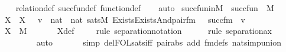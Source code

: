 \begin{isabellebody}
\ \ \isamarkupfalse%
\ relation{\isacharunderscore}{\kern0pt}def\ succ{\isacharunderscore}{\kern0pt}fun{\isacharunderscore}{\kern0pt}def\ function{\isacharunderscore}{\kern0pt}def\isanewline
\ \ \isamarkupfalse%
\ auto%
\endisatagproof
{\isafoldproof}%
%
\isadelimproof
\isanewline
%
\endisadelimproof
\isanewline
{}\isamarkupfalse%
\ succ{\isacharunderscore}{\kern0pt}fun{\isacharunderscore}{\kern0pt}in{\isacharunderscore}{\kern0pt}M\ {\isacharcolon}{\kern0pt}\ {\isachardoublequoteopen}succ{\isacharunderscore}{\kern0pt}fun\ {\isasymin}\ M{\isachardoublequoteclose}\isanewline
%
\isadelimproof
%
\endisadelimproof
%
\isatagproof
{}\isamarkupfalse%
\ {\isacharminus}{\kern0pt}\ \isanewline
\ \ \isamarkupfalse%
\ X\ \ {\isachardoublequoteopen}X\ {\isasymequiv}\ {\isacharbraceleft}{\kern0pt}\ v\ {\isasymin}\ nat\ {\isasymtimes}\ nat{\isachardot}{\kern0pt}\ sats{\isacharparenleft}{\kern0pt}M{\isacharcomma}{\kern0pt}\ Exists{\isacharparenleft}{\kern0pt}Exists{\isacharparenleft}{\kern0pt}And{\isacharparenleft}{\kern0pt}pair{\isacharunderscore}{\kern0pt}fm{\isacharparenleft}{\kern0pt}{}{\isacharcomma}{\kern0pt}\ {}{\isacharcomma}{\kern0pt}\ {}{\isacharparenright}{\kern0pt}{\isacharcomma}{\kern0pt}\ succ{\isacharunderscore}{\kern0pt}fm{\isacharparenleft}{\kern0pt}{}{\isacharcomma}{\kern0pt}\ {}{\isacharparenright}{\kern0pt}{\isacharparenright}{\kern0pt}{\isacharparenright}{\kern0pt}{\isacharparenright}{\kern0pt}{\isacharcomma}{\kern0pt}\ {\isacharbrackleft}{\kern0pt}v{\isacharbrackright}{\kern0pt}\ {\isacharat}{\kern0pt}\ {\isacharbrackleft}{\kern0pt}{\isacharbrackright}{\kern0pt}{\isacharparenright}{\kern0pt}\ {\isacharbraceright}{\kern0pt}{\isachardoublequoteclose}\isanewline
\ \ \isamarkupfalse%
\ {\isachardoublequoteopen}X\ {\isasymin}\ M{\isachardoublequoteclose}\ \isanewline
\ \ \ \ \isamarkupfalse%
\ X{\isacharunderscore}{\kern0pt}def\isanewline
\ \ \ \ \isamarkupfalse%
{\isacharparenleft}{\kern0pt}rule\ separation{\isacharunderscore}{\kern0pt}notation{\isacharparenright}{\kern0pt}\isanewline
\ \ \ \ \ \isamarkupfalse%
{\isacharparenleft}{\kern0pt}rule\ separation{\isacharunderscore}{\kern0pt}ax{\isacharparenright}{\kern0pt}\isanewline
\ \ \ \ \ \ \ \isamarkupfalse%
\ auto{\isacharbrackleft}{\kern0pt}{}{\isacharbrackright}{\kern0pt}\isanewline
\ \ \ \ \ \isamarkupfalse%
\ {\isacharparenleft}{\kern0pt}simp\ del{\isacharcolon}{\kern0pt}FOL{\isacharunderscore}{\kern0pt}sats{\isacharunderscore}{\kern0pt}iff\ pair{\isacharunderscore}{\kern0pt}abs\ add{\isacharcolon}{\kern0pt}\ fm{\isacharunderscore}{\kern0pt}defs\ nat{\isacharunderscore}{\kern0pt}simp{\isacharunderscore}{\kern0pt}union{\isacharparenright}{\kern0pt}\isanewline

\end{isabellebody}
